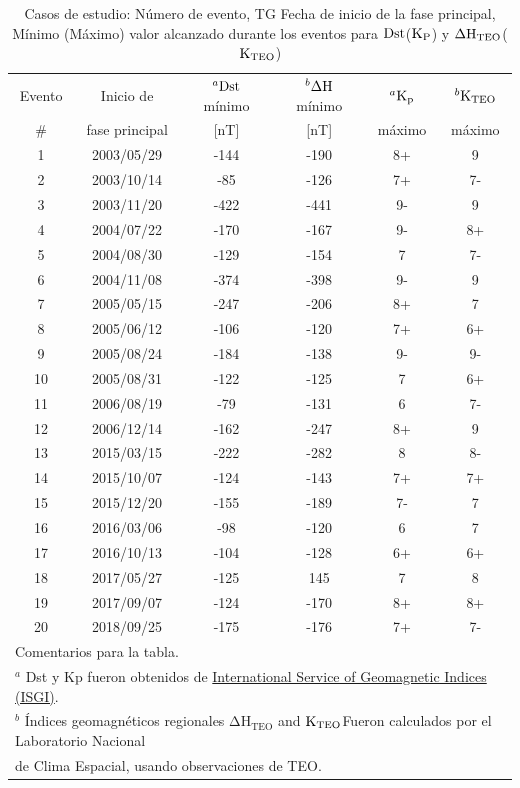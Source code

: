 \begin{table}[h!]
\normalsize
\centering
    \caption{Casos de estudio: Número de evento, TG Fecha de inicio de la fase principal, Mínimo (Máximo) valor alcanzado durante los eventos para ${\rm Dst}$(${\rm K_P}$) y ${\rm \Delta H_{TEO}}$(${\rm K_{TEO}}$)}
    \label{table1:GS_descp}
\begin{tabular}{cccccc}
\hline
Evento & Inicio de & $^a {\rm Dst}$ mínimo
 & $^b{\rm \Delta H}$ mínimo
 & $^a{\rm K_p}$ & $^b {\rm K_{TEO}}$ \\
\#    & fase principal & [nT] & [nT] & máximo & máximo\\
\hline
1 & 2003/05/29 & -144 & -190 & 8+ & 9 \\ 
2 & 2003/10/14 & -85 & -126 & 7+ & 7- \\ 
3 & 2003/11/20 & -422 & -441 & 9- & 9 \\ 
4 & 2004/07/22 & -170 & -167 & 9- & 8+ \\ 
5 & 2004/08/30 & -129 & -154 & 7 & 7- \\ 
6 & 2004/11/08 & -374 & -398 & 9- & 9 \\ 
7 & 2005/05/15 & -247 & -206 & 8+ & 7 \\ 
8 & 2005/06/12 & -106 & -120 & 7+ & 6+ \\ 
9 & 2005/08/24 & -184 & -138 & 9- & 9- \\ 
10 & 2005/08/31 & -122 & -125 & 7 & 6+ \\ 
11 & 2006/08/19 & -79 & -131 & 6 & 7- \\ 
12 & 2006/12/14 & -162 & -247 & 8+ & 9 \\ 
13 & 2015/03/15 & -222 & -282 & 8 & 8- \\ 
14 & 2015/10/07 & -124 & -143 & 7+ & 7+ \\ 
15 & 2015/12/20 & -155 & -189 & 7- & 7 \\ 
16 & 2016/03/06 & -98 & -120 & 6 & 7 \\ 
17 & 2016/10/13 & -104 & -128 & 6+ & 6+ \\ 
18 & 2017/05/27 & -125 & 145 & 7 & 8 \\ 
19 & 2017/09/07 & -124 & -170 & 8+ & 8+ \\ 
20 & 2018/09/25 & -175 & -176 & 7+ & 7- \\ 
\hline
\multicolumn{6}{l}{Comentarios para la tabla.} \\
\multicolumn{6}{l}{$^a$ Dst y Kp fueron obtenidos de \href{http://isgi.unistra.fr/data_download.php}{International Service of Geomagnetic Indices (ISGI)}.}\\
\multicolumn{6}{l}{$^b$ Índices geomagnéticos regionales $\mathrm{\Delta H_{TEO}}$ and ${\rm K_{TEO}}$Fueron calculados por el Laboratorio Nacional} \\
\multicolumn{6}{l}{de Clima Espacial, usando observaciones de TEO.}    \end{tabular}
\end{table}


